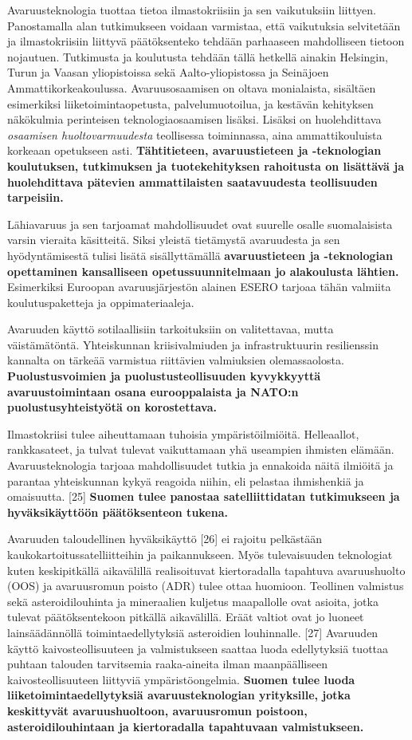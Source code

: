 Avaruusteknologia tuottaa tietoa ilmastokriisiin ja sen vaikutuksiin
liittyen. Panostamalla alan tutkimukseen voidaan varmistaa, että
vaikutuksia selvitetään ja ilmastokriisiin liittyvä päätöksenteko
tehdään parhaaseen mahdolliseen tietoon nojautuen. Tutkimusta ja
koulutusta tehdään tällä hetkellä ainakin Helsingin, Turun ja Vaasan
yliopistoissa sekä Aalto-yliopistossa ja Seinäjoen
Ammattikorkeakoulussa. Avaruusosaamisen on oltava monialaista, sisältäen
esimerkiksi liiketoimintaopetusta, palvelumuotoilua, ja kestävän
kehityksen näkökulmia perinteisen teknologiaosaamisen lisäksi. Lisäksi
on huolehdittava \emph{osaamisen huoltovarmuudesta} teollisessa
toiminnassa, aina ammattikouluista korkeaan opetukseen asti.
\textbf{Tähtitieteen, avaruustieteen ja -teknologian koulutuksen,
tutkimuksen ja tuotekehityksen rahoitusta on lisättävä ja huolehdittava
pätevien ammattilaisten saatavuudesta teollisuuden tarpeisiin.}

Lähiavaruus ja sen tarjoamat mahdollisuudet ovat suurelle osalle
suomalaisista varsin vieraita käsitteitä. Siksi yleistä tietämystä
avaruudesta ja sen hyödyntämisestä tulisi lisätä sisällyttämällä
\textbf{avaruustieteen ja -teknologian opettaminen kansalliseen
opetussuunnitelmaan jo alakoulusta lähtien.} Esimerkiksi Euroopan
avaruusjärjestön alainen ESERO tarjoaa tähän valmiita koulutuspaketteja
ja oppimateriaaleja.

Avaruuden käyttö sotilaallisiin tarkoituksiin on valitettavaa, mutta
väistämätöntä. Yhteiskunnan kriisivalmiuden ja infrastruktuurin
resilienssin kannalta on tärkeää varmistua riittävien valmiuksien
olemassaolosta. \textbf{Puolustusvoimien ja puolustusteollisuuden
kyvykkyyttä avaruustoimintaan osana eurooppalaista ja NATO:n
puolustusyhteistyötä on korostettava.}

Ilmastokriisi tulee aiheuttamaan tuhoisia ympäristöilmiöitä.
Helleaallot, rankkasateet, ja tulvat tulevat vaikuttamaan yhä useampien
ihmisten elämään. Avaruusteknologia tarjoaa mahdollisuudet tutkia ja
ennakoida näitä ilmiöitä ja parantaa yhteiskunnan kykyä reagoida niihin,
eli pelastaa ihmishenkiä ja omaisuutta. {[}25{]} \textbf{Suomen tulee
panostaa satelliittidatan tutkimukseen ja hyväksikäyttöön päätöksenteon
tukena. }

Avaruuden taloudellinen hyväksikäyttö {[}26{]} ei rajoitu pelkästään
kaukokartoitussatelliitteihin ja paikannukseen. Myös tulevaisuuden
teknologiat kuten keskipitkällä aikavälillä realisoituvat kiertoradalla
tapahtuva avaruushuolto (OOS) ja avaruusromun poisto (ADR) tulee ottaa
huomioon. Teollinen valmistus sekä asteroidilouhinta ja mineraalien
kuljetus maapallolle ovat asioita, jotka tulevat päätöksentekoon
pitkällä aikavälillä. Eräät valtiot ovat jo luoneet lainsäädännöllä
toimintaedellytyksiä asteroidien louhinnalle. {[}27{]} Avaruuden käyttö
kaivosteollisuuteen ja valmistukseen saattaa luoda edellytyksiä tuottaa
puhtaan talouden tarvitsemia raaka-aineita ilman maanpäälliseen
kaivosteollisuuteen liittyviä ympäristöongelmia. \textbf{Suomen tulee
luoda liiketoimintaedellytyksiä avaruusteknologian yrityksille, jotka
keskittyvät avaruushuoltoon, avaruusromun poistoon, asteroidilouhintaan
ja kiertoradalla tapahtuvaan valmistukseen.}

